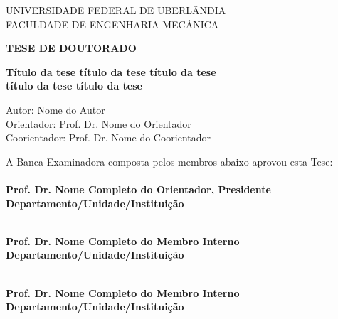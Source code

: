 \begin{center}
	
	{UNIVERSIDADE FEDERAL DE UBERLÂNDIA\\\vspace{1.2ex}}
	{FACULDADE DE ENGENHARIA MECÂNICA\\\vspace{1.2ex}}

	
	\vspace{1.5cm}
	\textbf{TESE DE DOUTORADO}
	
	\vspace{1.4cm}
	{\fontsize{23}{23} \textbf{Título da tese título da tese título da tese}}\\ \vspace{1.2ex}
	{\fontsize{23}{23} \textbf{título da tese título da tese}}\\ \vspace{1.2ex}
	\vspace{0.8cm}
	\begin{flushleft}
		\vspace{0.2cm}
		Autor: Nome do Autor\\
		\vspace{0.2cm}
		Orientador: Prof. Dr. Nome do Orientador\\
		Coorientador: Prof. Dr. Nome do Coorientador
		
		\vspace{0.2cm}
		A Banca Examinadora composta pelos membros abaixo aprovou esta Tese:\\
		\vspace{0.5cm}
		\hrulefill\\
		\textbf{Prof. Dr. Nome Completo do Orientador, Presidente\\
			Departamento/Unidade/Instituição \\}
		
		\vspace{0.5cm}
		\hrulefill\\
		\textbf{Prof. Dr. Nome Completo do Membro Interno \\
			Departamento/Unidade/Instituição \\}
		
		\vspace{0.5cm}
		\hrulefill\\
		\textbf{Prof. Dr. Nome Completo do Membro Interno \\
			Departamento/Unidade/Instituição \\}
		\vspace{0.5cm}
		

\end{flushleft}
\end{center}
